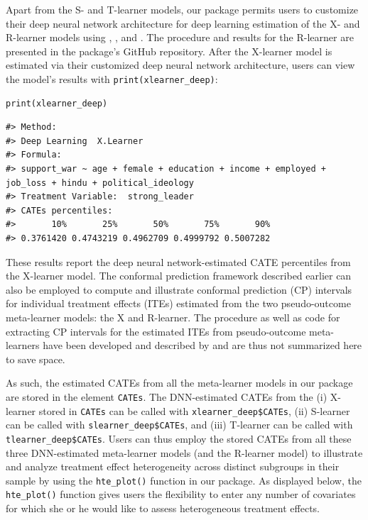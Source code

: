 Apart from the S- and T-learner models, our package permits users to
customize their deep neural network architecture for deep learning
estimation of the X- and R-learner models using ,
, and . The procedure and results for the
R-learner are presented in the package's GitHub repository. After the
X-learner model is estimated via their customized deep neural network
architecture, users can view the model's results with
\texttt{print(xlearner\_deep)}:

\begin{verbatim}
print(xlearner_deep)
\end{verbatim}

\begin{verbatim}
#> Method:
#> Deep Learning  X.Learner
#> Formula:
#> support_war ~ age + female + education + income + employed +      job_loss + hindu + political_ideology
#> Treatment Variable:  strong_leader
#> CATEs percentiles:
#>       10%       25%       50%       75%       90% 
#> 0.3761420 0.4743219 0.4962709 0.4999792 0.5007282
\end{verbatim}

These results report the deep neural network-estimated CATE percentiles
from the X-learner model. The conformal prediction framework described
earlier can also be employed to compute and illustrate conformal
prediction (CP) intervals for individual treatment effects (ITEs)
estimated from the two pseudo-outcome meta-learner models: the X and
R-learner. The procedure as well as code for extracting CP intervals for
the estimated ITEs from pseudo-outcome meta-learners have been developed
and described by \citet{Alaa2023conformal} and are thus not summarized here to
save space.

As such, the estimated CATEs from all the meta-learner models in our
package are stored in the element \texttt{CATEs}. The DNN-estimated CATEs from
the (i) X-learner stored in \texttt{CATEs} can be called with
\texttt{xlearner\_deep\$CATEs}, (ii) S-learner can be called with
\texttt{slearner\_deep\$CATEs}, and (iii) T-learner can be called with
\texttt{tlearner\_deep\$CATEs}. Users can thus employ the stored CATEs from all
these three DNN-estimated meta-learner models (and the R-learner model)
to illustrate and analyze treatment effect heterogeneity across distinct
subgroups in their sample by using the \texttt{hte\_plot()} function in our
package. As displayed below, the \texttt{hte\_plot()} function gives users the
flexibility to enter any number of covariates for which she or he would
like to assess heterogeneous treatment effects.

